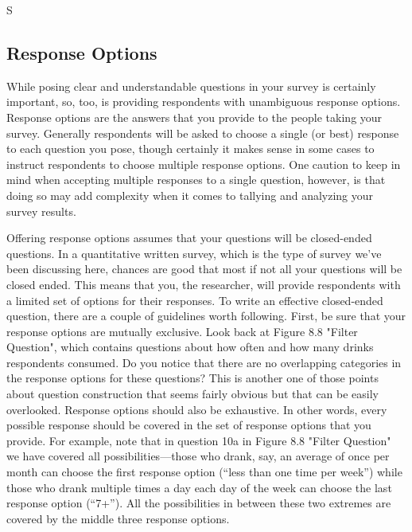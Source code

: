 S\subsection{Response Options}

While posing clear and understandable questions in your survey is certainly important, so, too, is providing respondents with unambiguous response options. Response options are the answers that you provide to the people taking your survey. Generally respondents will be asked to choose a single (or best) response to each question you pose, though certainly it makes sense in some cases to instruct respondents to choose multiple response options. One caution to keep in mind when accepting multiple responses to a single question, however, is that doing so may add complexity when it comes to tallying and analyzing your survey results.

Offering response options assumes that your questions will be closed-ended questions. In a quantitative written survey, which is the type of survey we’ve been discussing here, chances are good that most if not all your questions will be closed ended. This means that you, the researcher, will provide respondents with a limited set of options for their responses. To write an effective closed-ended question, there are a couple of guidelines worth following. First, be sure that your response options are mutually exclusive. Look back at Figure 8.8 "Filter Question", which contains questions about how often and how many drinks respondents consumed. Do you notice that there are no overlapping categories in the response options for these questions? This is another one of those points about question construction that seems fairly obvious but that can be easily overlooked. Response options should also be exhaustive. In other words, every possible response should be covered in the set of response options that you provide. For example, note that in question 10a in Figure 8.8 "Filter Question" we have covered all possibilities—those who drank, say, an average of once per month can choose the first response option (“less than one time per week”) while those who drank multiple times a day each day of the week can choose the last response option (“7+”). All the possibilities in between these two extremes are covered by the middle three response options.

